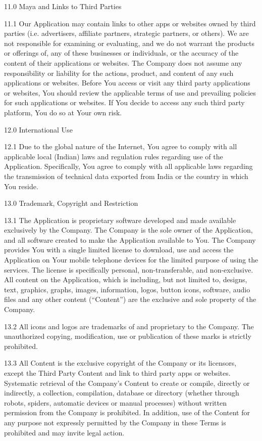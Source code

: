  

11.0       Maya and Links to Third Parties

11.1       Our Application may contain links to other apps or websites owned by third parties (i.e. advertisers, affiliate partners, strategic partners, or others). We are not responsible for examining or evaluating, and we do not warrant the products or offerings of, any of these businesses or individuals, or the accuracy of the content of their applications or websites. The Company does not assume any responsibility or liability for the actions, product, and content of any such applications or websites. Before You access or visit any third party applications or websites, You should review the applicable terms of use and prevailing policies for such applications or websites. If You decide to access any such third party platform, You do so at Your own risk.

 

12.0       International Use

12.1       Due to the global nature of the Internet, You agree to comply with all applicable local (Indian) laws and regulation rules regarding use of the Application. Specifically, You agree to comply with all applicable laws regarding the transmission of technical data exported from India or the country in which You reside.

 

13.0     Trademark, Copyright and Restriction

13.1      The Application is proprietary software developed and made available exclusively by the Company. The Company is the sole owner of the Application, and all software created to make the Application available to You. The Company provides You with a single limited license to download, use and access the Application on Your mobile telephone devices for the limited purpose of using the services. The license is specifically personal, non-transferable, and non-exclusive. All content on the Application, which is including, but not limited to, designs, text, graphics, graphs, images, information, logos, button icons, software, audio files and any other content (“Content”)  are the exclusive and sole property of the Company.

13.2      All icons and logos are trademarks of and proprietary to the Company. The unauthorized copying, modification, use or publication of these marks is strictly prohibited.

13.3      All Content is the exclusive copyright of the Company or its licensors, except the Third Party Content and link to third party apps or websites. Systematic retrieval of the Company’s Content to create or compile, directly or indirectly, a collection, compilation, database or directory (whether through robots, spiders, automatic devices or manual processes) without written permission from the Company is prohibited. In addition, use of the Content for any purpose not expressly permitted by the Company in these Terms is prohibited and may invite legal action.

